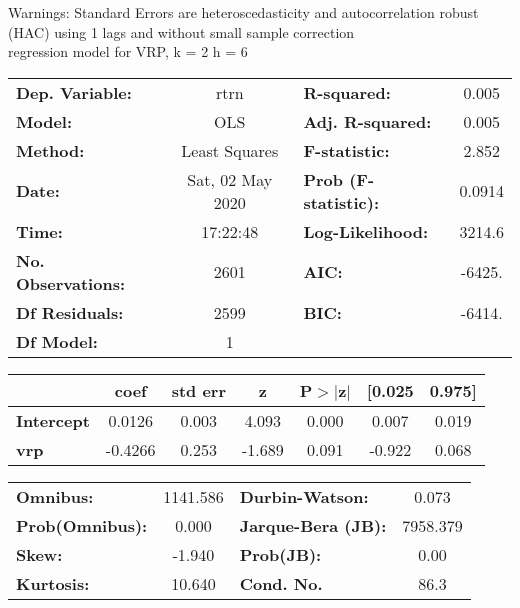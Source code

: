 Warnings: \newline
 [1] Standard Errors are heteroscedasticity and autocorrelation robust (HAC) using 1 lags and without small sample correction\\ 

regression model for VRP, k = 2 h = 6\begin{center}
\begin{tabular}{lclc}
\toprule
\textbf{Dep. Variable:}    &       rtrn       & \textbf{  R-squared:         } &     0.005   \\
\textbf{Model:}            &       OLS        & \textbf{  Adj. R-squared:    } &     0.005   \\
\textbf{Method:}           &  Least Squares   & \textbf{  F-statistic:       } &     2.852   \\
\textbf{Date:}             & Sat, 02 May 2020 & \textbf{  Prob (F-statistic):} &   0.0914    \\
\textbf{Time:}             &     17:22:48     & \textbf{  Log-Likelihood:    } &    3214.6   \\
\textbf{No. Observations:} &        2601      & \textbf{  AIC:               } &    -6425.   \\
\textbf{Df Residuals:}     &        2599      & \textbf{  BIC:               } &    -6414.   \\
\textbf{Df Model:}         &           1      & \textbf{                     } &             \\
\bottomrule
\end{tabular}
\begin{tabular}{lcccccc}
                   & \textbf{coef} & \textbf{std err} & \textbf{z} & \textbf{P$> |$z$|$} & \textbf{[0.025} & \textbf{0.975]}  \\
\midrule
\textbf{Intercept} &       0.0126  &        0.003     &     4.093  &         0.000        &        0.007    &        0.019     \\
\textbf{vrp}       &      -0.4266  &        0.253     &    -1.689  &         0.091        &       -0.922    &        0.068     \\
\bottomrule
\end{tabular}
\begin{tabular}{lclc}
\textbf{Omnibus:}       & 1141.586 & \textbf{  Durbin-Watson:     } &    0.073  \\
\textbf{Prob(Omnibus):} &   0.000  & \textbf{  Jarque-Bera (JB):  } & 7958.379  \\
\textbf{Skew:}          &  -1.940  & \textbf{  Prob(JB):          } &     0.00  \\
\textbf{Kurtosis:}      &  10.640  & \textbf{  Cond. No.          } &     86.3  \\
\bottomrule
\end{tabular}
\end{center}

